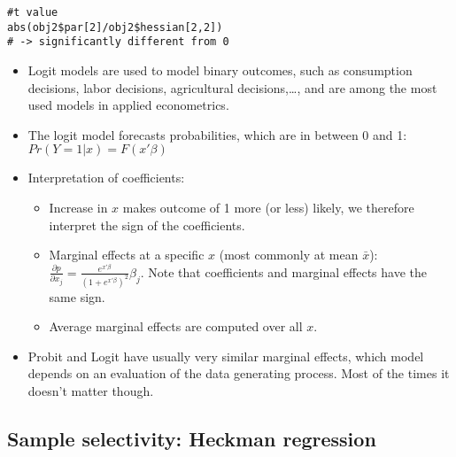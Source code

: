 \documentclass{article}
\begin{document}
\begin{solution}
\begin{verbatim}
#t value
abs(obj2$par[2]/obj2$hessian[2,2])
# -> significantly different from 0
\end{verbatim}
\begin{itemize}
  \item Logit models are used to model binary outcomes, such as consumption decisions, labor decisions, agricultural decisions,\dots, and are among the most used models in applied econometrics.
  \item The logit model forecasts probabilities, which are in between 0 and 1: $Pr(Y=1|x)=F(x'\beta)$
  \item Interpretation of coefficients:
  \begin{itemize}
    \item Increase in $x$ makes outcome of 1 more (or less) likely, we therefore interpret the sign of the coefficients.
    \item Marginal effects at a specific $x$ (most commonly at mean $\bar{x}$): $\frac{\partial p}{\partial x_j} = \frac{e^{x'\beta}}{(1+e^{x'\beta})^2}\beta_j$. Note that coefficients and marginal effects have the same sign.
    \item Average marginal effects are computed over all $x$.
  \end{itemize}
  \item Probit and Logit have usually very similar marginal effects, which model depends on an evaluation of the data generating process. Most of the times it doesn't matter though.
\end{itemize}
\end{solution}

\subsection{Sample selectivity: Heckman regression\label{mlheckman}}
\end{document}
